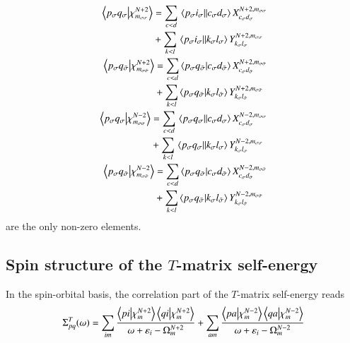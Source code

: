 \documentclass[aip,jcp,reprint,noshowkeys,superscriptaddress]{revtex4-1}
\newcommand{\e}[1]{\eps_{#1}}
\newcommand{\eps}{\varepsilon}
\newcommand{\sig}{\sigma}
\newcommand{\bsig}{{\Bar{\sigma}}}
\begin{document}
\begin{align}
	\begin{split}
		\braket{p_\sig q_\sig}{\chi_{m_{\sig\sig}}^{N+2}} 
		& = \sum_{c < d} \mel{p_\sig i_\sig}{}{c_\sig d_\sig} X_{c_\sig d_\sig}^{N+2,m_{\sig\sig}} 
		\\
		& + \sum_{k < l} \mel{p_\sig i_\sig}{}{k_\sig l_\sig} Y_{k_\sig l_\sig}^{N+2,m_{\sig\sig}}
	\end{split}
	\\
	\begin{split}
		\braket{p_\sig q_\bsig}{\chi_{m_{\sig\bsig}}^{N+2}} 
		& = \sum_{c < d} \braket{p_\sig q_\bsig}{c_\sig d_\bsig} X_{c_\sig d_\bsig}^{N+2,m_{\sig\bsig}} 
		\\
		& + \sum_{k < l} \braket{p_\sig q_\bsig}{k_\sig l_\bsig} Y_{k_\sig l_\bsig}^{N+2,m_{\sig\bsig}}
	\end{split}
	\\
	\begin{split}
		\braket{p_\sig q_\sig}{\chi_{m_{\sig\sig}}^{N-2}} 
		& = \sum_{c < d} \mel{p_\sig q_\sig}{}{c_\sig d_\sig} X_{c_\sig d_\sig}^{N-2,m_{\sig\sig}} 
		\\
		& + \sum_{k < l} \mel{p_\sig q_\sig}{}{k_\sig l_\sig} Y_{k_\sig l_\sig}^{N-2,m_{\sig\sig}}
	\end{split}
	\\
	\begin{split}
		\braket{p_\sig q_\bsig}{\chi_{m_{\sig\bsig}}^{N-2}} 
		& = \sum_{c < d} \braket{p_\sig q_\bsig}{c_\sig d_\bsig} X_{c_\sig d_\bsig}^{N-2,m_{\sig\bsig}} 
		\\
		& + \sum_{k < l} \braket{p_\sig q_\bsig}{k_\sig l_\bsig} Y_{k_\sig l_\bsig}^{N-2,m_{\sig\bsig}}
	\end{split}
\end{align}
are the only non-zero elements.
\subsection{Spin structure of the $T$-matrix self-energy}
In the spin-orbital basis, the correlation part of the $T$-matrix self-energy reads \cite{Zhang_2017}
\begin{equation}
	\Sigma^{T}_{pq}(\omega)
	= \sum_{im} \frac{\braket{pi}{\chi_m^{N+2}}\braket{qi}{\chi_m^{N+2}}}{\omega + \e{i}{} - \Omega_m^{N+2}}
	+ \sum_{am} \frac{\braket{pa}{\chi_m^{N-2}}\braket{qa}{\chi_m^{N-2}}}{\omega + \e{i}{} - \Omega_m^{N-2}}
\end{equation}
\end{document}

